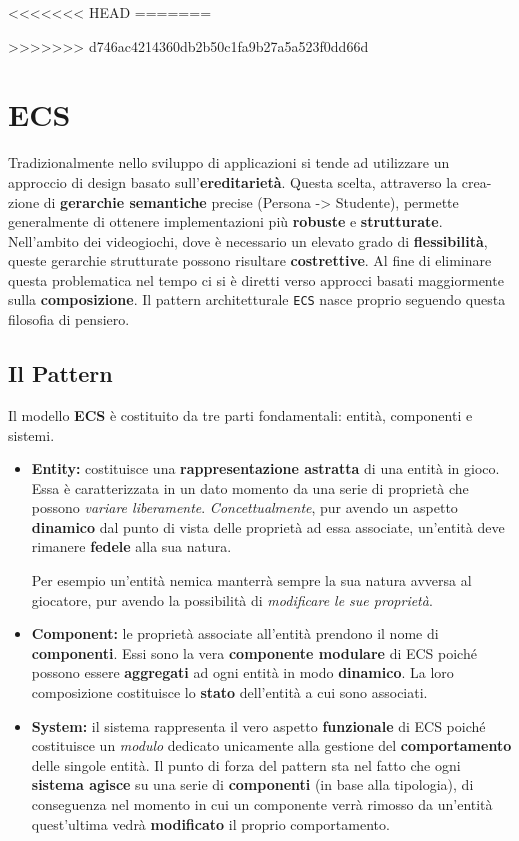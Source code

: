 <<<<<<< HEAD
=======
 
>>>>>>> d746ac4214360db2b50c1fa9b27a5a523f0dd66d
\section{ECS}
\label{sec:ecs_design}
Tradizionalmente nello sviluppo di applicazioni si tende ad utilizzare un approccio di design basato sull'\textbf{ereditarietà}. Questa scelta, attraverso la crea-zione di \textbf{gerarchie semantiche} precise (Persona -> Studente), permette generalmente di ottenere implementazioni più \textbf{robuste} e \textbf{strutturate}. Nell'ambito dei videogiochi, dove è necessario un elevato grado di \textbf{flessibilità}, queste gerarchie strutturate possono risultare \textbf{costrettive}.
Al fine di eliminare questa problematica nel tempo ci si è diretti verso approcci basati maggiormente sulla \textbf{composizione}. Il pattern architetturale \texttt{ECS} nasce proprio seguendo questa filosofia di pensiero.

\subsection{Il Pattern}
\label{subsec:ecs_pattern}
Il modello \textbf{ECS} è costituito da tre parti fondamentali: entità, componenti e sistemi.
\begin{itemize}
	\item{\textbf{Entity:}} costituisce una \textbf{rappresentazione astratta} di una entità in gioco. Essa è caratterizzata in un dato momento da una serie di proprietà che possono \textit{variare liberamente}. \textit{Concettualmente}, pur avendo un aspetto \textbf{dinamico} dal punto di vista delle proprietà ad essa associate, un'entità deve rimanere \textbf{fedele} alla sua natura. 

	Per esempio un'entità nemica manterrà sempre la sua natura avversa al giocatore, pur avendo la possibilità di \textit{modificare le sue proprietà}.
	\item{\textbf{Component:}} le proprietà associate all'entità prendono il nome di \textbf{componenti}. Essi sono la vera \textbf{componente modulare} di ECS poiché possono essere \textbf{aggregati} ad ogni entità in modo \textbf{dinamico}. La loro composizione costituisce lo \textbf{stato} dell'entità a cui sono associati.
	\item{\textbf{System:}} il sistema rappresenta il vero aspetto \textbf{funzionale} di ECS poiché costituisce un \textit{modulo} dedicato unicamente alla gestione del \textbf{comportamento} delle singole entità. Il punto di forza del pattern sta nel fatto che ogni \textbf{sistema agisce} su una serie di \textbf{componenti} (in base alla tipologia), di conseguenza nel momento in cui un componente verrà rimosso da un'entità quest'ultima vedrà \textbf{modificato} il proprio comportamento.
\end{itemize}

